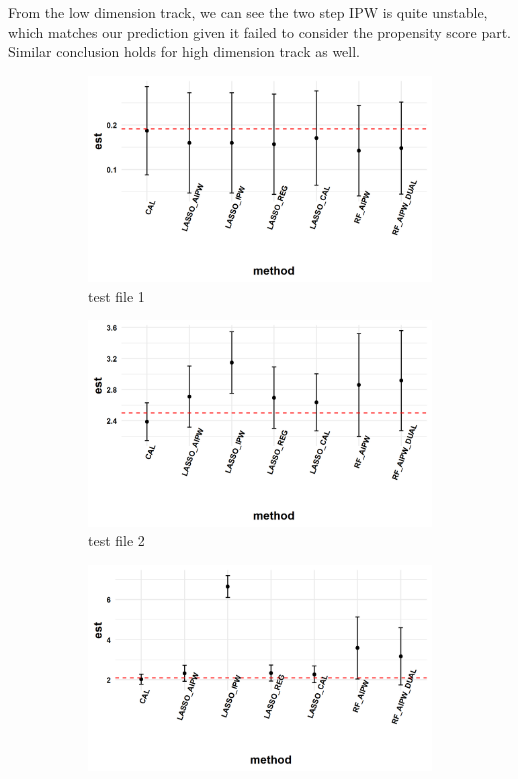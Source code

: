 \documentclass[11pt, oneside]{article}
\begin{document}
From the low dimension track, we can see the two step IPW is quite unstable, which matches our prediction given it failed to consider the propensity score part. Similar conclusion holds for high dimension track as well. 
\begin{figure}[h]
  \begin{subfigure}{0.24\textwidth}
    \includegraphics[width=\textwidth]{../plot/method_comparison_high_1.png}
    \caption{test file 1}
  \end{subfigure}
  \begin{subfigure}{0.24\textwidth}
    \includegraphics[width=\textwidth]{../plot/method_comparison_high_2.png}
    \caption{test file 2}
  \end{subfigure}
  \begin{subfigure}{0.24\textwidth}
    \includegraphics[width=\textwidth]{../plot/method_comparison_high_3.png}

\end{subfigure}
\end{figure}
\end{document}
